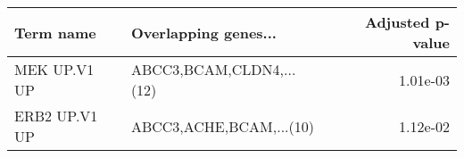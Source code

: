 \begin{tabular}{llr}
\toprule
    Term name &     Overlapping genes... &  Adjusted p-value \\
\midrule
 MEK UP.V1 UP & ABCC3,BCAM,CLDN4,...(12) &          1.01e-03 \\
ERB2 UP.V1 UP &  ABCC3,ACHE,BCAM,...(10) &          1.12e-02 \\
\bottomrule
\end{tabular}
